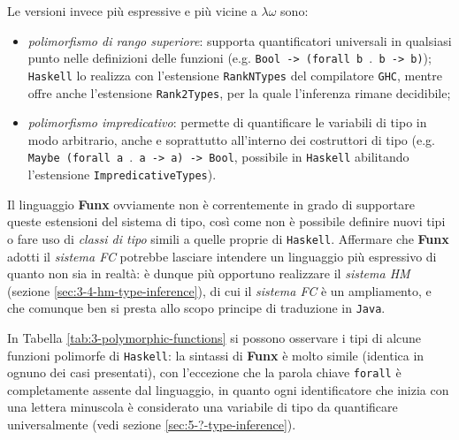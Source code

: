 \noindent Le versioni invece più espressive e più vicine a $\lambda\omega$ sono:
\begin{itemize}
    \item \textit{polimorfismo di rango superiore}: supporta quantificatori universali in qualsiasi punto
          nelle definizioni delle funzioni (e.g. \texttt{Bool -> (forall b $\mathord{.}$ b -> b)});
          \texttt{Haskell} lo realizza con l'estensione \texttt{RankNTypes} del compilatore \texttt{GHC},
          mentre offre anche l'estensione \texttt{Rank2Types}, per la quale l'inferenza rimane decidibile;
    \item \textit{polimorfismo impredicativo}: permette di quantificare le variabili di tipo in modo arbitrario,
          anche e soprattutto all'interno dei costruttori di tipo (e.g. \texttt{Maybe (forall a $\mathord{.}$ a -> a) -> Bool},
          possibile in \texttt{Haskell} abilitando l'estensione \texttt{ImpredicativeTypes}).
\end{itemize}

\noindent Il linguaggio \textbf{Funx} ovviamente non è correntemente in grado di supportare queste estensioni
del sistema di tipo, così come non è possibile definire nuovi tipi o fare uso di \textit{classi di tipo}
simili a quelle proprie di \texttt{Haskell}. Affermare che \textbf{Funx} adotti il \textit{sistema FC} potrebbe
lasciare intendere un linguaggio più espressivo di quanto non sia in realtà: è dunque più opportuno realizzare
il \textit{sistema HM} (sezione \ref{sec:3-4-hm-type-inference}), di cui il \textit{sistema FC} è un ampliamento,
e che comunque ben si presta allo scopo principe di traduzione in \texttt{Java}.


In Tabella \ref{tab:3-polymorphic-functions} si possono osservare i tipi di alcune funzioni polimorfe
di \texttt{Haskell}: la sintassi di \textbf{Funx} è molto simile (identica in ognuno dei casi presentati),
con l'eccezione che la parola chiave \texttt{forall} è completamente assente dal linguaggio, in quanto ogni identificatore
che inizia con una lettera minuscola è considerato una variabile di tipo da quantificare universalmente
(vedi sezione \ref{sec:5-?-type-inference}).

\newpage

